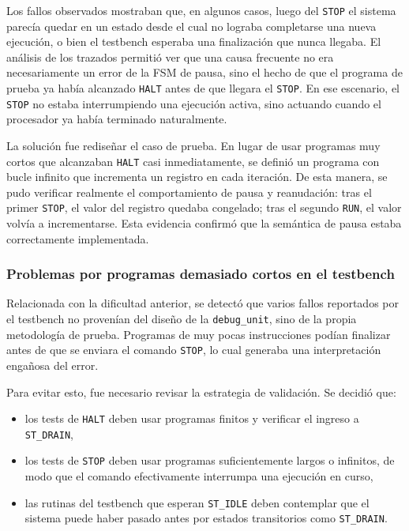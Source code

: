 Los fallos observados mostraban que, en algunos casos, luego del \texttt{STOP} el sistema parecía quedar en un estado desde el cual no lograba completarse una nueva ejecución, o bien el testbench esperaba una finalización que nunca llegaba. El análisis de los trazados permitió ver que una causa frecuente no era necesariamente un error de la FSM de pausa, sino el hecho de que el programa de prueba ya había alcanzado \texttt{HALT} antes de que llegara el \texttt{STOP}. En ese escenario, el \texttt{STOP} no estaba interrumpiendo una ejecución activa, sino actuando cuando el procesador ya había terminado naturalmente.

La solución fue rediseñar el caso de prueba. En lugar de usar programas muy cortos que alcanzaban \texttt{HALT} casi inmediatamente, se definió un programa con bucle infinito que incrementa un registro en cada iteración. De esta manera, se pudo verificar realmente el comportamiento de pausa y reanudación: tras el primer \texttt{STOP}, el valor del registro quedaba congelado; tras el segundo \texttt{RUN}, el valor volvía a incrementarse. Esta evidencia confirmó que la semántica de pausa estaba correctamente implementada.

\subsubsection{Problemas por programas demasiado cortos en el testbench}

Relacionada con la dificultad anterior, se detectó que varios fallos reportados por el testbench no provenían del diseño de la \texttt{debug\_unit}, sino de la propia metodología de prueba. Programas de muy pocas instrucciones podían finalizar antes de que se enviara el comando \texttt{STOP}, lo cual generaba una interpretación engañosa del error.

Para evitar esto, fue necesario revisar la estrategia de validación. Se decidió que:

\begin{itemize}
    \item los tests de \texttt{HALT} deben usar programas finitos y verificar el ingreso a \texttt{ST\_DRAIN},
    \item los tests de \texttt{STOP} deben usar programas suficientemente largos o infinitos, de modo que el comando efectivamente interrumpa una ejecución en curso,
    \item las rutinas del testbench que esperan \texttt{ST\_IDLE} deben contemplar que el sistema puede haber pasado antes por estados transitorios como \texttt{ST\_DRAIN}.
\end{itemize}

